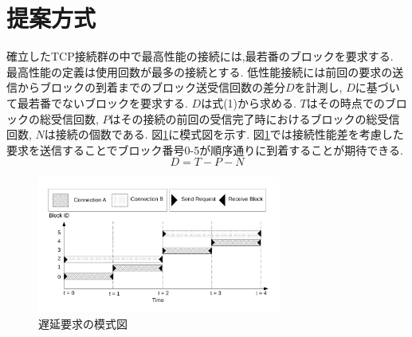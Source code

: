 \documentclass{ltjsarticle}
\begin{document}
\section{提案方式}
\vspace{-2mm}
確立したTCP接続群の中で最高性能の接続には,最若番のブロックを要求する.
最高性能の定義は使用回数が最多の接続とする.
低性能接続には前回の要求の送信からブロックの到着までのブロック送受信回数の差分\begin{math}D\end{math}を計測し,
\begin{math}D\end{math}に基づいて最若番でないブロックを要求する.
\begin{math}D\end{math}は式(1)から求める.
\begin{math}T\end{math}はその時点でのブロックの総受信回数,
\begin{math}P\end{math}はその接続の前回の受信完了時におけるブロックの総受信回数,
\begin{math}N\end{math}は接続の個数である.
図\ref{delay}に模式図を示す.
図\ref{delay}では接続性能差を考慮した要求を送信することでブロック番号0-5が順序通りに到着することが期待できる.
\vspace{-3mm}
\label{eq}
\begin{equation}
	D = T - P - N
\end{equation}
\vspace{-10mm}
\begin{figure}[h]
	\centering
	\includegraphics[width=8cm]{figure/delay.pdf}
	\vspace{-6mm}
	\caption{遅延要求の模式図}
	\label{delay}
\end{figure}
\vspace{-12mm}
\end{document}
